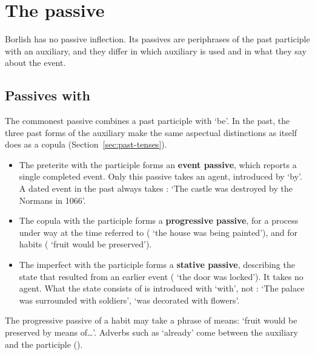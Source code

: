 \section{The passive}\label{sec:passive}
Borlish has no passive inflection. Its passives are periphrases of the past participle with an auxiliary, and they differ in which auxiliary is used and in what they say about the event.

\subsection{Passives with }\label{sec:passive-star}
The commonest passive combines a past participle with  `be'. In the past, the three past forms of the auxiliary make the same aspectual distinctions as  itself does as a copula (Section~\ref{sec:past-tenses}).
\begin{itemize}
    \item The preterite  with the participle forms an \textbf{event passive}, which reports a single completed event. Only this passive takes an agent, introduced by  `by'. A dated event in the past always takes :  `The castle was destroyed by the Normans in 1066'.
    \item The copula  with the participle forms a \textbf{progressive passive}, for a process under way at the time referred to ( `the house was being painted'), and for habits ( `fruit would be preserved').
    \item The imperfect  with the participle forms a \textbf{stative passive}, describing the state that resulted from an earlier event ( `the door was locked'). It takes no agent. What the state consists of is introduced with  `with', not :  `The palace was surrounded with soldiers',  `was decorated with flowers'.
\end{itemize}
The progressive passive of a habit may take a  phrase of means:  `fruit would be preserved by means of\ldots'. Adverbs such as  `already' come between the auxiliary and the participle ().

